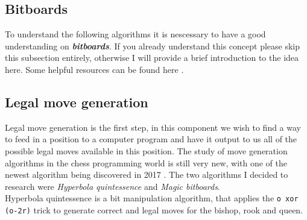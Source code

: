 \subsection*{Bitboards}
To understand the following algorithms it is nescessary to 
have a good understanding on \textbf{\textit{bitboards}}.
If you already understand this concept please skip this 
subsection entirely, otherwise I will provide a brief 
introduction to the idea here. Some helpful resources can be
found here \cite{bitboards}.

\subsection*{Legal move generation}
Legal move generation is the first step, in this component we wish to 
find a way to feed in a position to a computer program and have it 
output to us all of the possible legal moves available in this position.
The study of move generation algorithms in the chess programming world 
is still very new, with one of the newest algorithm being
discovered in 2017 \cite{bm}. The two algorithms I decided to research 
were \textit{Hyperbola quintessence} and \textit{Magic bitboards}.\\

Hyperbola quintessence is a bit manipulation algorithm, that
applies the \texttt{o xor (o-2r)} trick to generate correct
and legal moves for the bishop, rook and queen.

